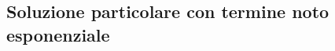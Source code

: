 \subsection{Soluzione particolare con termine noto esponenziale}
\label{sec:esercizi-equazioni-differenziali-termine-noto-esponenziale}
